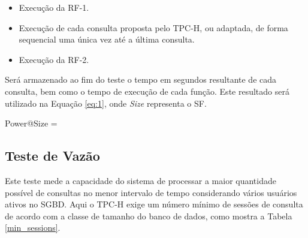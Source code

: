 \begin{itemize}
	\item Execução da RF-1.
	\item Execução de cada consulta proposta pelo TPC-H, ou adaptada, de forma sequencial uma única vez até a última consulta.
	\item Execução da RF-2.
\end{itemize}

Será armazenado ao fim do teste o tempo em segundos resultante de cada consulta, bem como o tempo de execução de cada função. Este resultado será utilizado na Equação \ref{eq:1}, onde \textit{Size} representa o SF.

\begin{myequation}%
\label{eq:1}
{\scriptstyle Power@Size} =  %
\end{myequation}
%

\subsection{Teste de Vazão}
\label{through_test}
Este teste mede a capacidade do sistema de processar a maior quantidade possível de consultas no menor intervalo de tempo considerando vários usuários ativos no SGBD. Aqui o TPC-H exige um número mínimo de sessões de consulta de acordo com a classe de tamanho do banco de dados, como mostra a Tabela \ref{min_sessions}.

